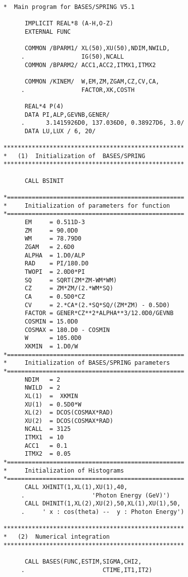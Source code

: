 \clearpage
{}
\par
{\scriptsize
\begin{verbatim}
*  Main program for BASES/SPRING V5.1
 
      IMPLICIT REAL*8 (A-H,O-Z)
      EXTERNAL FUNC
 
      COMMON /BPARM1/ XL(50),XU(50),NDIM,NWILD,
     .                IG(50),NCALL 
      COMMON /BPARM2/ ACC1,ACC2,ITMX1,ITMX2
 
      COMMON /KINEM/  W,EM,ZM,ZGAM,CZ,CV,CA,
     .                FACTOR,XK,COSTH
 
      REAL*4 P(4)
      DATA PI,ALP,GEVNB,GENER/
     .      3.1415926D0, 137.036D0, 0.38927D6, 3.0/
      DATA LU,LUX / 6, 20/
 
***************************************************
*   (1)  Initialization of  BASES/SPRING
***************************************************

      CALL BSINIT

*==================================================
*     Initialization of parameters for function
*==================================================
      EM     = 0.511D-3
      ZM     = 90.0D0
      WM     = 78.79D0
      ZGAM   = 2.6D0
      ALPHA  = 1.D0/ALP
      RAD    = PI/180.D0
      TWOPI  = 2.0D0*PI
      SQ     = SQRT(ZM*ZM-WM*WM)
      CZ     = ZM*ZM/(2.*WM*SQ)
      CA     = 0.5D0*CZ
      CV     = 2.*CA*(2.*SQ*SQ/(ZM*ZM) - 0.5D0)
      FACTOR = GENER*CZ**2*ALPHA**3/12.0D0/GEVNB
      COSMIN = 15.0D0
      COSMAX = 180.D0 - COSMIN
      W      = 105.0D0
      XKMIN  = 1.D0/W
*==================================================
*     Initialization of BASES/SPRING parameters
*==================================================
      NDIM   = 2
      NWILD  = 2
      XL(1)  =  XKMIN
      XU(1)  = 0.5D0*W
      XL(2)  = DCOS(COSMAX*RAD)
      XU(2)  = DCOS(COSMAX*RAD)
      NCALL  = 3125
      ITMX1  = 10
      ACC1   = 0.1
      ITMX2  = 0.05
*==================================================
*     Initialization of Histograms
*==================================================
      CALL XHINIT(1,XL(1),XU(1),40,
     .                   'Photon Energy (GeV)')
      CALL DHINIT(1,XL(2),XU(2),50,XL(1),XU(1),50,
     .     ' x : cos(theta) --  y : Photon Energy')

***************************************************
*   (2)  Numerical integration
***************************************************

      CALL BASES(FUNC,ESTIM,SIGMA,CHI2,
     .                      CTIME,IT1,IT2)


\end{verbatim}}
